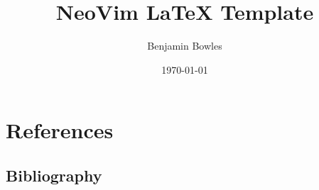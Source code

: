 \documentclass{article}
\title{NeoVim LaTeX Template}
\author{Benjamin Bowles}
\date{\today}
\begin{document}
\maketitle
\newpage

\tableofcontents
\newpage

\section{References}
\cite{TestBook}


\subsection{Bibliography}



\newpage
\end{document}
